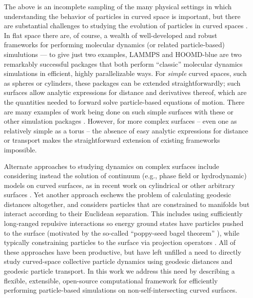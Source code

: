\documentclass[preprint,12pt]{elsarticle}
\begin{document}
The above is an incomplete sampling of the many physical settings in which understanding the behavior of particles in curved space is important, but there are substantial challenges to studying the evolution of particles in curved spaces \cite{tarjus2011statistical}.
In flat space there are, of course, a wealth of well-developed and robust frameworks for performing molecular dynamics (or related particle-based) simulutions --- to give just two examples, LAMMPS \cite{thompson2022lammps} and HOOMD-blue \cite{anderson2020hoomd} are two remarkably successful packages that both perform ``classic'' molecular dynamics simulations in efficient, highly parallelizable ways.
For \emph{simple} curved spaces, such as spheres or cylinders, these packages can be extended straightforwardly; such surfaces allow analytic expressions for distance and derivatives thereof, which are the quantities needed to forward solve particle-based equations of motion. 
There are many examples of work being done on such simple surfaces with these or other  simulation packages \cite{activesphere2015,sussmancurvrigid2020, thomas2023shape}.
However, for more complex surfaces -- even one as relatively simple as a torus -- the absence of easy analytic expressions for distance or transport makes the straightforward extension of existing frameworks impossible.

Alternate approaches to studying dynamics on complex surfaces include considering instead the solution of continuum (e.g., phase field or hydrodynamic) models on curved surfaces, as in recent work on cylindrical \cite{happel2022effects} or other arbitrary surfaces \cite{rank2021active,hueschen2023wildebeest}.
Yet another approach eschews the problem of calculating geodesic distances altogether, and considers particles that are constrained to manifolds but interact according to their Euclidean separation.
This includes using sufficiently long-ranged repulsive interactions so energy ground states have particles pushed to the surface \cite{giomi2008elastic} (motivated by the so-called ``poppy-seed bagel theorem'' \cite{hardin2005minimal}), while typically constraining particles to the surface via projection operators \cite{tarjus2011statistical,schonhofer2022curvature}.
All of these approaches have been productive, but have left unfilled a need to directly study curved-space collective particle dynamics using geodesic distances and geodesic particle transport. In this work we address this need by describing a flexible, extensible, open-source computational framework for efficiently performing particle-based simulations on non-self-intersecting curved surfaces.
\end{document}
